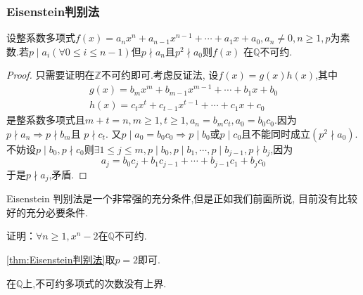 \subsubsection{Eisenstein判别法}
\begin{formal}
\begin{theorem}[Eisenstein判别法]\label{thm:Eisenstein判别法}
    设整系数多项式$f\left(x\right)=a_nx^n+a_{n-1}x^{n-1}+\cdots+a_1x+a_0,a_n\neq 0,n\geqslant 1,p$为素数.若$p\mid a_i\left(\forall 0\leqslant i\leqslant n-1\right)$但$p\nmid a_n$且$p^2
    \nmid a_0$则$f\left(x\right)$
    在$\mathbb{Q}$不可约.
\end{theorem}
\begin{proof}
    只需要证明在$\mathbb{Z}$不可约即可.考虑反证法,
    设$f\left(x\right)=g\left(x\right)h\left(x\right)$,其中
    \newpage
    \begin{align*}
        g\left(x\right)=b_mx^m+b_{m-1}x^{m-1}+\cdots+b_1x+b_0\\
        h\left(x\right)=c_tx^{t}+c_{t-1}x^{t-1}+\cdots+c_1x+c_0
    \end{align*}
    是整系数多项式且$m+t=n,
    m\geqslant1,t\geqslant 1,a_n=b_mc_t,a_0=b_0c_0.$因为
    $p\nmid a_n\Longrightarrow p\nmid b_m$且
    $p\nmid c_t.$
    又$p\mid a_0=b_0c_0
    \Longrightarrow p\mid b_0$或$p\mid c_0$且不能同时成立$\left(p^2\nmid a_0
    \right)$.不妨设$p\mid b_0,p\nmid c_0$则$\exists 1\leqslant j\leqslant m,p\mid b_0,p\mid b_1,\cdots,p\mid b_{j-1},p\nmid 
    b_j$,因为\[
    a_j=b_0c_j+b_1c_{j-1}+\cdots+b_{j-1}c_1+b_jc_0
    \]
    于是$p\nmid a_j$,矛盾.
\end{proof}
\end{formal}
\begin{red}
\begin{remark}
    \textup{Eisenstein}
    判别法是一个非常强的充分条件,但是正如我们前面所说,
    目前没有比较好的充分必要条件.
\end{remark}
\end{red}
\begin{brown}
\begin{example}
    证明：$\forall n\geqslant 1,x^n-2$在$\mathbb{Q}$不可约.
\end{example}
\begin{Proof}
\cref{thm:Eisenstein判别法}取$p=2$即可.
\end{Proof}
\end{brown}
\begin{red}
\begin{remark}
    在$\mathbb{Q}$上,不可约多项式的次数没有上界.
\end{remark}
\end{red}
